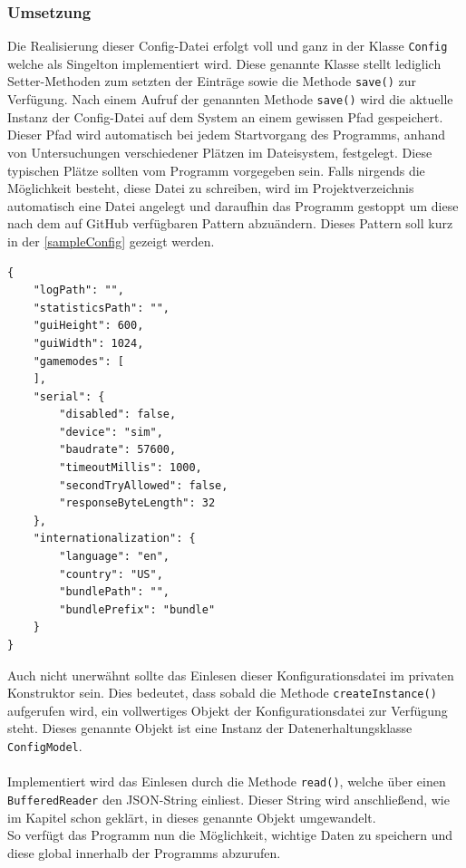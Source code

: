 \subsubsection{Umsetzung}
Die Realisierung dieser Config-Datei erfolgt voll und ganz in der Klasse \lstinline[style=java]{Config} welche als Singelton implementiert wird.
Diese genannte Klasse stellt lediglich Setter-Methoden zum setzten der Einträge sowie die Methode \lstinline[style=java]{save()} zur Verfügung.
Nach einem Aufruf der genannten Methode \lstinline[style=java]{save()} wird die aktuelle Instanz der Config-Datei auf dem System an einem gewissen Pfad gespeichert.
Dieser Pfad wird automatisch bei jedem Startvorgang des Programms, anhand von Untersuchungen verschiedener Plätzen im Dateisystem, festgelegt.
Diese typischen Plätze sollten vom Programm vorgegeben sein.
Falls nirgends die Möglichkeit besteht, diese Datei zu schreiben, wird im Projektverzeichnis automatisch eine Datei angelegt und daraufhin das Programm gestoppt um diese nach dem auf GitHub verfügbaren Pattern abzuändern.
Dieses Pattern soll kurz in der \autoref{sampleConfig} gezeigt werden.
\begin{lstlisting}[style=json, caption=JSON-Codebeispiel,label=sampleConfig]
{
    "logPath": "",
    "statisticsPath": "",
    "guiHeight": 600,
    "guiWidth": 1024,
    "gamemodes": [
    ],
    "serial": {
        "disabled": false,
        "device": "sim",
        "baudrate": 57600,
        "timeoutMillis": 1000,
        "secondTryAllowed": false,
        "responseByteLength": 32
    },
    "internationalization": {
        "language": "en",
        "country": "US",
        "bundlePath": "",
        "bundlePrefix": "bundle"
    }
}
\end{lstlisting}
Auch nicht unerwähnt sollte das Einlesen dieser Konfigurationsdatei im privaten Konstruktor sein.
Dies bedeutet, dass sobald die Methode \lstinline[style=java]{createInstance()} aufgerufen wird, ein vollwertiges Objekt der Konfigurationsdatei zur Verfügung steht.
Dieses genannte Objekt ist eine Instanz der Datenerhaltungsklasse \lstinline[style=java]{ConfigModel}.\\\\
Implementiert wird das Einlesen durch die Methode \lstinline[style=java]{read()}, welche über einen \lstinline[style=java]{BufferedReader} den JSON-String einliest.
Dieser String wird anschließend, wie im Kapitel  schon geklärt, in dieses genannte Objekt umgewandelt.\\
So verfügt das Programm nun die Möglichkeit, wichtige Daten zu speichern und diese global innerhalb der Programms abzurufen.
